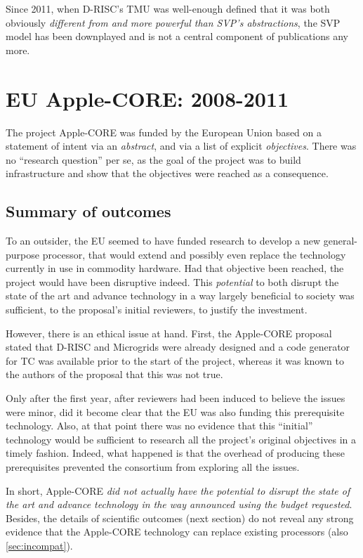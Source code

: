 Since 2011, when D-RISC's TMU was well-enough defined that it was
both obviously \emph{different from and more powerful than SVP's abstractions},
the SVP model has been downplayed and is not a central component of
publications any more.

\section{EU Apple-CORE: 2008-2011}

The project Apple-CORE was funded by the European Union based on a
statement of intent via an \emph{abstract}, and via a list of explicit 
\emph{objectives}. There was no ``research question'' per se, as
the goal of the project was to build infrastructure and show
that the objectives were reached as a consequence.

\subsection{Summary of outcomes}

To an outsider, 
the EU seemed to have funded research to develop a new general-purpose processor,
that would extend and possibly even replace the technology currently
in use in commodity hardware. Had that objective been reached, the
project would have been disruptive indeed. This \emph{potential} to
both disrupt the state of the art and advance technology in a way
largely beneficial to society was sufficient, to the proposal's
initial reviewers, to justify the investment.

However, there is an ethical issue at hand. First, the Apple-CORE
proposal stated that D-RISC and Microgrids were already
designed and a code generator for TC was available prior
to the start of the project, whereas it was known to the authors of the proposal that
this was not true. 

Only after the first year, after reviewers had been induced to believe
the issues were minor, did it become clear that the EU was also
funding this prerequisite technology. Also, at that point there was no
evidence that this ``initial'' technology would be sufficient to
research all the project's original objectives in a timely fashion.
Indeed, what happened is that the overhead of producing these
prerequisites prevented the consortium from exploring all the issues.

In short, Apple-CORE \emph{did not actually have the potential to
  disrupt the state of the art and advance technology in the way
  announced using the budget requested}. Besides, the details of scientific
outcomes (\cf next section) do not reveal any strong evidence that the
Apple-CORE technology can replace existing processors (\cf also \cref{sec:incompat}). 

